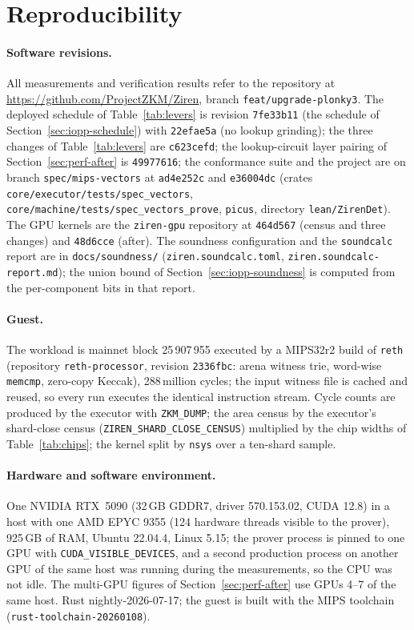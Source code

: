 \section{Reproducibility}
\label{sec:repro}
\sloppy

\paragraph{Software revisions.} All measurements and verification results refer to the \Ziren{} repository at \url{https://github.com/ProjectZKM/Ziren}, branch \texttt{feat/upgrade-plonky3}. The deployed schedule of Table~\ref{tab:levers} is revision \texttt{7fe33b11} (the \WHIR{} schedule of Section~\ref{sec:iopp-schedule}) with \texttt{22efae5a} (no lookup grinding); the three changes of Table~\ref{tab:levers} are \texttt{c623cefd}; the lookup-circuit layer pairing of Section~\ref{sec:perf-after} is \texttt{49977616}; the conformance suite and the \Lean{} project are on branch \texttt{spec/mips-vectors} at \texttt{ad4e252c} and \texttt{e36004dc} (crates \texttt{core/executor/tests/spec\_vectors}, \texttt{core/machine/tests/spec\_vectors\_prove}, \texttt{picus}, directory \texttt{lean/ZirenDet}). The GPU kernels are the \texttt{ziren-gpu} repository at \texttt{464d567} (census and three changes) and \texttt{48d6cce} (after). The soundness configuration and the \texttt{soundcalc} report are in \texttt{docs/soundness/} (\texttt{ziren.soundcalc.toml}, \texttt{ziren.soundcalc-report.md}); the union bound of Section~\ref{sec:iopp-soundness} is computed from the per-component bits in that report.

\paragraph{Guest.} The workload is mainnet block 25\,907\,955 executed by a MIPS32r2 build of \texttt{reth} (repository \texttt{reth-processor}, revision \texttt{2336fbc}: arena witness trie, word-wise \texttt{memcmp}, zero-copy Keccak), 288\,million cycles; the input witness file is cached and reused, so every run executes the identical instruction stream. Cycle counts are produced by the executor with \texttt{ZKM\_DUMP}; the area census by the executor's shard-close census (\texttt{ZIREN\_SHARD\_CLOSE\_CENSUS}) multiplied by the chip widths of Table~\ref{tab:chips}; the kernel split by \texttt{nsys} over a ten-shard sample.

\paragraph{Hardware and software environment.} One NVIDIA RTX~5090 (32\,GB GDDR7, driver 570.153.02, CUDA 12.8) in a host with one AMD EPYC 9355 (124 hardware threads visible to the prover), 925\,GB of RAM, Ubuntu 22.04.4, Linux 5.15; the prover process is pinned to one GPU with \texttt{CUDA\_VISIBLE\_DEVICES}, and a second production process on another GPU of the same host was running during the measurements, so the CPU was not idle. The multi-GPU figures of Section~\ref{sec:perf-after} use GPUs 4--7 of the same host. Rust nightly-2026-07-17; the guest is built with the \Ziren{} MIPS toolchain (\texttt{rust-toolchain-20260108}).

